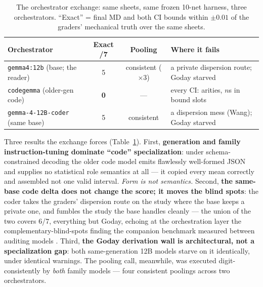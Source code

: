 \documentclass[11pt]{article}
\begin{document}
\begin{table}[t]
\centering\footnotesize
\setlength{\tabcolsep}{4pt}
\caption{The orchestrator exchange: same sheets, same frozen 10-net harness, three orchestrators. ``Exact'' = final MD and both CI bounds within $\pm 0.01$ of the graders' mechanical truth over the same sheets.}
\label{tab:orchestrators}
\begin{tabular}{lccl}
\toprule
Orchestrator & Exact /7 & Pooling & Where it fails \\
\midrule
\texttt{gemma4:12b} (base; the reader) & 5 & consistent ($\times$3) & a private dispersion route; Goday starved \\
\texttt{codegemma} (older-gen code) & \textbf{0} & --- & every CI: arities, $n$s in bound slots \\
\texttt{gemma-4-12B-coder} (same base) & 5 & consistent & a dispersion mess (Wang); Goday starved \\
\bottomrule
\end{tabular}
\end{table}

Three results the exchange forces (Table~\ref{tab:orchestrators}). First, \textbf{generation and family instruction-tuning dominate ``code'' specialization}: under schema-constrained decoding the older code model emits flawlessly well-formed JSON and supplies no statistical role semantics at all --- it copied every mean correctly and assembled not one valid interval. \emph{Form is not semantics.} Second, \textbf{the same-base code delta does not change the score; it moves the blind spots}: the coder takes the graders' dispersion route on the study where the base keeps a private one, and fumbles the study the base handles cleanly --- the union of the two covers 6/7, everything but Goday, echoing at the orchestration layer the complementary-blind-spots finding the companion benchmark measured between auditing models \citep{barra2026companion}. Third, \textbf{the Goday derivation wall is architectural, not a specialization gap}: both same-generation 12B models starve on it identically, under identical warnings. The pooling call, meanwhile, was executed digit-consistently by \emph{both} family models --- four consistent poolings across two orchestrators.
\end{document}
